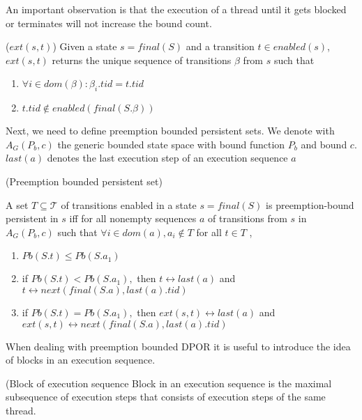 An important observation is that the execution of a thread until it gets blocked or terminates will not increase
the bound count.
\begin{definition}{($ext(s,t)$)}
    Given a state $s = final(S)$ and a transition $t \in enabled(s)$,
    $ext(s,t)$ returns the unique sequence of transitions $\beta$ from $s$
    such that
    \begin{enumerate}
        \item $\forall i \in dom(\beta): \beta_i.tid = t.tid$
        \item $t.tid \notin enabled(final(S.\beta))$
    \end{enumerate}
\end{definition}

Next, we need to define preemption bounded persistent sets. We denote with $A_G(P_b,c)$ the generic 
bounded state space with bound function $P_b$ and bound $c$. $last(a)$ denotes the last execution step of
an execution sequence $a$

\begin{definition}{(Preemption bounded persistent set)}

A set $T \subseteq \mathcal{T}$ of transitions enabled in a state $s=final(S)$
is preemption-bound persistent in $s$ iff for all nonempty
sequences $a$ of transitions from $s$ in $A_G(P_b,c)$ such that
$\forall i \in dom(a), a_i \notin T$ for all $t \in T$ ,

\begin{enumerate}
\item $Pb(S.t) \leq Pb(S.a_1)$
\item if $Pb(S.t)<Pb(S.a_{1}) ,$ then $t \leftrightarrow last(a)$ and $t \leftrightarrow  next(final(S.a), last(a).tid)$
\item if $Pb(S.t)=Pb(S.a_{1}),$ then $ext(s,t) \leftrightarrow last(a)$ and $ext(s,t) \leftrightarrow next(final(S.a), last(a).tid)$
\end{enumerate}

\end{definition}

When dealing with preemption bounded DPOR it is useful to introduce the idea of blocks in an execution sequence.

\begin{definition}{(Block of execution sequence}
    Block in an execution sequence is the maximal subsequence of execution steps that consists of execution steps of the same thread.
\end{definition}

